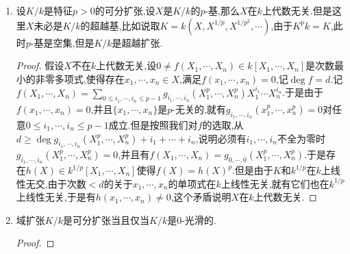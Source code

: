 \begin{enumerate}
\begin{proof}
    	必要性.如果$K/k$是0-平展的,那么从0-非分歧就得到$\Omega_{K/k}=0$,从0-光滑和微分模的第一基本正合列得到$\Omega_K=\Omega_k\otimes_kK$.于是如果$X$是$k$的绝对$p$-基,那么$\{\mathrm{d}x\mid x\in X\}$是$\Omega_k$在$k$上的基,那么这个等式说明$\{\mathrm{d}x\mid x\in X\}$也是$\Omega_K$的基,于是$X$也是$K$的绝对$p$-基.
    	
    	\qquad
    	
    	充分性.设$C$是$k$代数,设$N$是$C$的理想使得$N^2=0$,考虑如下交换图表,我们要找唯一的同态$K\to C$使得图表交换.任取$\alpha\in K$,任取$u(\alpha)$在$C$中的提升$a$,那么$a^p$是不依赖于提升$a$的选取的,因为如果$a_1$是另一个提升,那么存在$x\in N$使得$a_1=a+x$,于是$a_1^p=a^p+x^p$,但是这里$p\ge2$,所以$x^p=0$.构造同态$v_0:K^p\to C$为$\alpha^p\mapsto a^p$,这是定义良性的.至此我们还没有用$K/k$上的条件.按照条件$K/k$是可分扩张,并且$K=K^pk$.于是$K$和$k^{1/p}$在$k$上线性无交,于是$K^p$和$k$在$k^p$上线性无交,于是有$K=K^pk=K^p\otimes_{k^p}k$.于是$v_0:K^p\to C$可以延拓为$v:K\to Cc$使得图表交换.这证明了$K/k$是0-光滑的,最后从$K^pk=K$得到$K/k$的$p$-基是空集,导致$\Omega_{K/k}=0$,也即$K/k$是0-非分歧的.
    	$$\xymatrix{K\ar[rr]^u\ar@{-->}[drr]^v&&C/N\\k\ar[u]^i\ar[rr]_j&&C\ar[u]_g}$$
    \end{proof}
    \item 设$K/k$是特征$p>0$的可分扩张,设$X$是$K/k$的$p$-基,那么$X$在$k$上代数无关.但是这里$X$未必是$K/k$的超越基,比如说取$K=k(X,X^{1/p},X^{1/p^2},\cdots)$,由于$K^pk=K$,此时$p$-基是空集,但是$K/k$是超越扩张.
    \begin{proof}
    	
    	假设$X$不在$k$上代数无关,设$0\not=f(X_1,\cdots,X_n)\in k[X_1,\cdots,X_n]$是次数最小的非零多项式,使得存在$x_1,\cdots,x_n\in X$,满足$f(x_1,\cdots,x_n)=0$,记$\deg f=d$.记$f(X_1,\cdots,X_n)=\sum_{0\le i_1,\cdots,i_n\le p-1}g_{i_1,\cdots,i_n}(X_1^p,\cdots,X_n^p)X_1^{i_1}\cdots X_n^{i_n}$.于是由于$f(x_1,\cdots,x_n)=0$,并且$\{x_1,\cdots,x_n\}$是$p$-无关的,就有$g_{i_1,\cdots,i_n}(x_1^p,\cdots,x_n^p)=0$对任意$0\le i_1,\cdots,i_n\le p-1$成立.但是按照我们对$f$的选取,从$d\ge\deg g_{i_1,\cdots,i_n}(X_1^p,\cdots,X_n^p)+i_1+\cdots+i_n$,说明必须有$i_1,\cdots,i_n$不全为零时$g_{i_1,\cdots,i_n}(X_1^p,\cdots,X_n^p)=0$,并且有$f(X_1,\cdots,X_n)=g_{0,\cdots,0}(X_1^p,\cdots,X_n^p)$.于是存在$h(X)\in k^{1/p}[X_1,\cdots,X_n]$使得$f(X)=h(X)^p$.但是由于$K$和$k^{1/p}$在$k$上线性无交,由于次数$<d$的关于$x_1,\cdots,x_n$的单项式在$k$上线性无关,就有它们也在$k^{1/p}$上线性无关,于是有$h(x_1,\cdots,x_n)\not=0$,这个矛盾说明$X$在$k$上代数无关.
    \end{proof}
    \item 域扩张$K/k$是可分扩张当且仅当$K/k$是0-光滑的.
    \begin{proof}
    	

\end{proof}
\end{enumerate}
